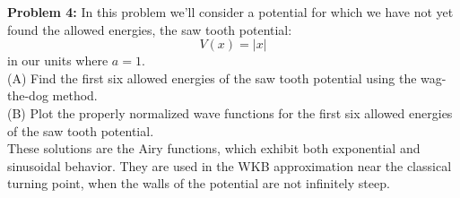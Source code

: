 \documentclass[12pt]{book}
\begin{document}
\noindent
{\bf Problem 4:}  In this problem we'll consider a potential for which we have not yet found the allowed energies, the saw tooth potential:
$$V(x) = |x|$$
in our units where $a=1$.\\[5pt]

\noindent
(A) Find the first six allowed energies of the saw tooth potential using the wag-the-dog method.\\[5pt]

\noindent
(B) Plot the properly normalized wave functions for the first six allowed energies of the saw tooth potential.\\[5pt]

\noindent
These solutions are the Airy functions, which exhibit both exponential and sinusoidal behavior.  They are used in the WKB approximation near the classical turning point, when the walls of the potential are not infinitely steep.
\end{document}
